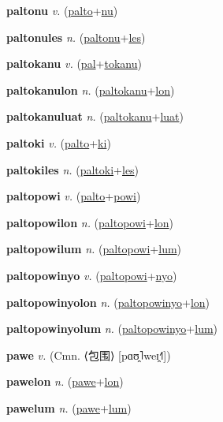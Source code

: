 \textbf{\hypertarget{paltonu}{paltonu}} \textit{v.} (\hyperlink{palto}{palto}+\allowbreak \hyperlink{nu}{nu})


\textbf{\hypertarget{paltonules}{paltonules}} \textit{n.} (\hyperlink{paltonu}{paltonu}+\allowbreak \hyperlink{les}{les})


\textbf{\hypertarget{paltokanu}{paltokanu}} \textit{v.} (\hyperlink{pal}{pal}+\allowbreak \hyperlink{tokanu}{tokanu})


\textbf{\hypertarget{paltokanulon}{paltokanulon}} \textit{n.} (\hyperlink{paltokanu}{paltokanu}+\allowbreak \hyperlink{lon}{lon})


\textbf{\hypertarget{paltokanuluat}{paltokanuluat}} \textit{n.} (\hyperlink{paltokanu}{paltokanu}+\allowbreak \hyperlink{luat}{luat})


\textbf{\hypertarget{paltoki}{paltoki}} \textit{v.} (\hyperlink{palto}{palto}+\allowbreak \hyperlink{ki}{ki})


\textbf{\hypertarget{paltokiles}{paltokiles}} \textit{n.} (\hyperlink{paltoki}{paltoki}+\allowbreak \hyperlink{les}{les})


\textbf{\hypertarget{paltopowi}{paltopowi}} \textit{v.} (\hyperlink{palto}{palto}+\allowbreak \hyperlink{powi}{powi})


\textbf{\hypertarget{paltopowilon}{paltopowilon}} \textit{n.} (\hyperlink{paltopowi}{paltopowi}+\allowbreak \hyperlink{lon}{lon})


\textbf{\hypertarget{paltopowilum}{paltopowilum}} \textit{n.} (\hyperlink{paltopowi}{paltopowi}+\allowbreak \hyperlink{lum}{lum})


\textbf{\hypertarget{paltopowinyo}{paltopowinyo}} \textit{v.} (\hyperlink{paltopowi}{paltopowi}+\allowbreak \hyperlink{nyo}{nyo})


\textbf{\hypertarget{paltopowinyolon}{paltopowinyolon}} \textit{n.} (\hyperlink{paltopowinyo}{paltopowinyo}+\allowbreak \hyperlink{lon}{lon})


\textbf{\hypertarget{paltopowinyolum}{paltopowinyolum}} \textit{n.} (\hyperlink{paltopowinyo}{paltopowinyo}+\allowbreak \hyperlink{lum}{lum})


\textbf{\hypertarget{pawe}{pawe}} \textit{v.} (Cmn. ⟨{\chinese{}包围}⟩ [pɑʊ̯˥weɪ̯˧˥])


\textbf{\hypertarget{pawelon}{pawelon}} \textit{n.} (\hyperlink{pawe}{pawe}+\allowbreak \hyperlink{lon}{lon})


\textbf{\hypertarget{pawelum}{pawelum}} \textit{n.} (\hyperlink{pawe}{pawe}+\allowbreak \hyperlink{lum}{lum})


